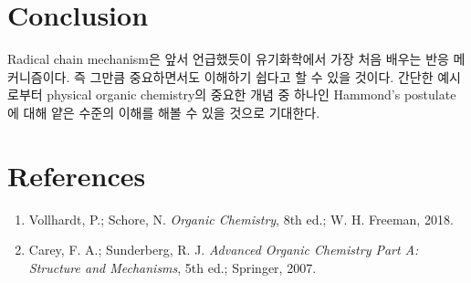 \documentclass[a4paper, 9pt]{article}
\begin{document}
\section{Conclusion}
Radical chain mechanism은 앞서 언급했듯이 유기화학에서 가장 처음 배우는 반응 메커니즘이다. 즉 그만큼 중요하면서도 이해하기 쉽다고 할 수 있을 것이다. 간단한 예시로부터 physical organic chemistry의 중요한 개념 중 하나인 Hammond's postulate에 대해 얕은 수준의 이해를 해볼 수 있을 것으로 기대한다.
\section{References}
\begin{enumerate}
	\item Vollhardt, P.; Schore, N. \textit{Organic Chemistry}, 8th ed.; W. H. Freeman, 2018.
	\item Carey, F. A.; Sunderberg, R. J. \textit{Advanced Organic Chemistry Part A: Structure and Mechanisms}, 5th ed.; Springer, 2007.
\end{enumerate}
\end{document}
